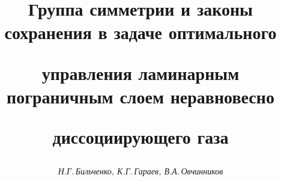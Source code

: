 




% 





\newcommand{\PR}{\operatorname{Pr}}


\newcommand{\Le}{\operatorname{Le}}


\newcommand{\myrule}{\vrule height 13pt width 0 pt depth 7pt}


\newcommand{\mybrule}{\vrule height 20pt width 0 pt depth 13pt}


\newcommand{\tts}[1]{}











 


\setcounter{page}{11}















\author{\it Н.Г.\,Бильченко, К.Г.\,Гараев, В.А.\,Овчинников }




\title{Группа симметрии и законы сохранения в задаче оптимального 


управления ламинарным пограничным слоем неравновесно 


диссоциирующего газа}





\date{}




